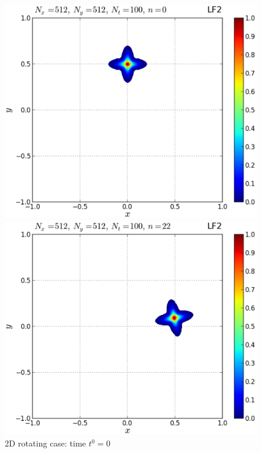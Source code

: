 \documentclass[11pt,titlepage]{report}
\begin{document}
\begin{figure}[h!] 
\label{fig:var_vel} 
\captionsetup{width=0.48\linewidth}
\begin{minipage}[b]{0.5\linewidth}
\centering
\includegraphics[width=\linewidth]{graphics/plot_-_flower_F12_Nx512Nt100_it00000_eps}
\caption{2D rotating case: time $t^0 = 0$}
\vspace{4ex}
\end{minipage}%
\begin{minipage}[b]{0.5\linewidth}
\centering
\includegraphics[width=\linewidth]{graphics/plot_-_flower_F12_Nx512Nt100_it00022_eps}

\end{minipage}
\end{figure}
\end{document}
